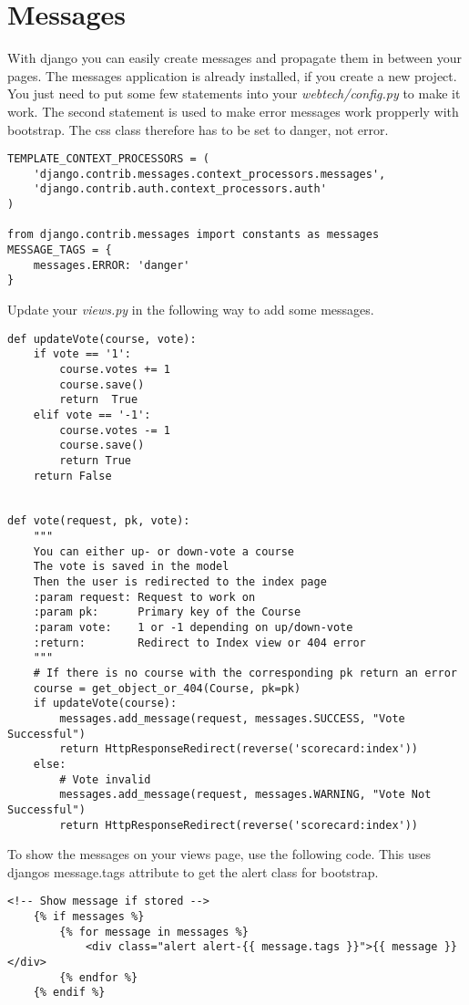 \section{Messages}

With django you can easily create messages and propagate them in between your pages. The messages application is already installed, if you create a new project. You just need to put some few statements into your \emph{webtech/config.py} to make it work. The second statement is used to make error messages work propperly with bootstrap. The css class therefore has to be set to danger, not error.
\begin{lstlisting}[style=Python, caption=webtech/config.py, label=lst:config.py1]
TEMPLATE_CONTEXT_PROCESSORS = (
    'django.contrib.messages.context_processors.messages',
    'django.contrib.auth.context_processors.auth'
)

from django.contrib.messages import constants as messages
MESSAGE_TAGS = {
    messages.ERROR: 'danger'
}
\end{lstlisting}

Update your \emph{views.py} in the following way to add some messages.
\begin{lstlisting}[style=Python, caption=Add messages to views, label=lst:views_msg]
def updateVote(course, vote):
    if vote == '1':
        course.votes += 1
        course.save()
        return  True
    elif vote == '-1':
        course.votes -= 1
        course.save()
        return True
    return False


def vote(request, pk, vote):
    """
    You can either up- or down-vote a course
    The vote is saved in the model
    Then the user is redirected to the index page
    :param request: Request to work on
    :param pk:      Primary key of the Course
    :param vote:    1 or -1 depending on up/down-vote
    :return:        Redirect to Index view or 404 error
    """
    # If there is no course with the corresponding pk return an error
    course = get_object_or_404(Course, pk=pk)
    if updateVote(course):
        messages.add_message(request, messages.SUCCESS, "Vote Successful")
        return HttpResponseRedirect(reverse('scorecard:index'))
    else:
        # Vote invalid
        messages.add_message(request, messages.WARNING, "Vote Not Successful")
        return HttpResponseRedirect(reverse('scorecard:index'))
\end{lstlisting}

To show the messages on your views page, use the following code. This uses djangos message.tags attribute to get the alert class for bootstrap.
\begin{lstlisting}[style=HTML, caption=index.html, label=lst:index.html1]
    <!-- Show message if stored -->
    {% if messages %}
        {% for message in messages %}
            <div class="alert alert-{{ message.tags }}">{{ message }}</div>
        {% endfor %}
    {% endif %}
\end{lstlisting}